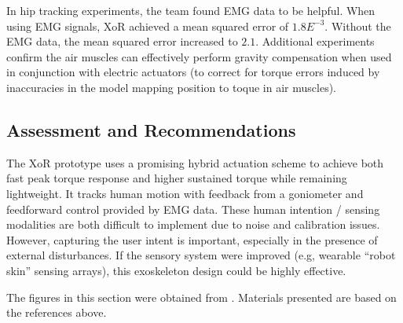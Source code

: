 \begin{refsection}
In hip tracking experiments, the team found EMG data to be helpful.  When using EMG signals, XoR achieved a mean squared error of $1.8E^{-3}$.  Without the EMG data, the mean squared error increased to $2.1$.  Additional experiments confirm the air muscles can effectively perform gravity compensation when used in conjunction with electric actuators (to correct for torque errors induced by inaccuracies in the model mapping position to toque in air muscles).


\subsection{Assessment and Recommendations}

The XoR prototype uses a promising hybrid actuation scheme to achieve both fast peak torque response and higher sustained torque while remaining lightweight.  It tracks human motion with feedback from a goniometer and feedforward control provided by EMG data.  These human intention / sensing modalities are both difficult to implement due to noise and calibration issues.  However, capturing the user intent is important, especially in the presence of external disturbances.  If the sensory system were improved (e.g, wearable ``robot skin'' sensing arrays), this exoskeleton design could be highly effective. 

\nocite{*}
\printbibliography[heading=subbibliography]

The figures in this section were obtained from \cite{xorDesign2011,XoRkinemExtraction2012}. Materials presented are based on the references above.

\end{refsection}
